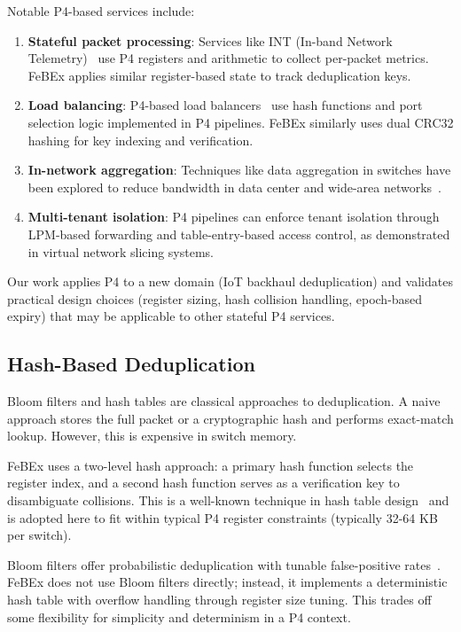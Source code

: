 Notable P4-based services include:

\begin{enumerate}
    \item \textbf{Stateful packet processing}: Services like INT (In-band Network Telemetry)~\cite{int} use P4 registers and arithmetic to collect per-packet metrics. FeBEx applies similar register-based state to track deduplication keys.
    \item \textbf{Load balancing}: P4-based load balancers~\cite{conga,clove} use hash functions and port selection logic implemented in P4 pipelines. FeBEx similarly uses dual CRC32 hashing for key indexing and verification.
    \item \textbf{In-network aggregation}: Techniques like data aggregation in switches have been explored to reduce bandwidth in data center and wide-area networks~\cite{netcache}.
    \item \textbf{Multi-tenant isolation}: P4 pipelines can enforce tenant isolation through LPM-based forwarding and table-entry-based access control, as demonstrated in virtual network slicing systems.
\end{enumerate}

Our work applies P4 to a new domain (IoT backhaul deduplication) and validates practical design choices (register sizing, hash collision handling, epoch-based expiry) that may be applicable to other stateful P4 services.

\subsection{Hash-Based Deduplication}

Bloom filters and hash tables are classical approaches to deduplication. A naive approach stores the full packet or a cryptographic hash and performs exact-match lookup. However, this is expensive in switch memory.

FeBEx uses a two-level hash approach: a primary hash function selects the register index, and a second hash function serves as a verification key to disambiguate collisions. This is a well-known technique in hash table design~\cite{hashtables} and is adopted here to fit within typical P4 register constraints (typically 32-64 KB per switch).

Bloom filters offer probabilistic deduplication with tunable false-positive rates~\cite{bloomfilters}. FeBEx does not use Bloom filters directly; instead, it implements a deterministic hash table with overflow handling through register size tuning. This trades off some flexibility for simplicity and determinism in a P4 context.

